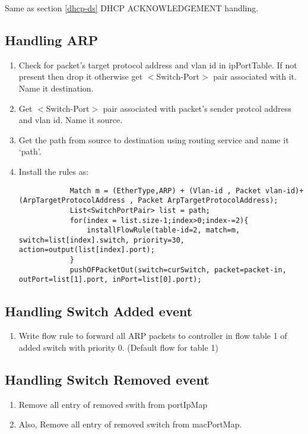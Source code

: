 \documentclass{article}
\begin{document}
Same as section \ref{dhcp-ds} DHCP ACKNOWLEDGEMENT handling.

\subsection{Handling ARP}

\begin{enumerate}
	\item Check for packet's target protocol address and vlan id in ipPortTable. If not present then drop it otherwise get $<$Switch-Port$>$ pair associated with it. Name it destination.
	\item Get $<$Switch-Port$>$ pair associated with packet's sender protcol address and vlan id. Name it source.
	\item Get the path from source to destination using routing service and name it `path'.
	\item Install the rules as:
		\begin{lstlisting}
			Match m = (EtherType,ARP) + (Vlan-id , Packet vlan-id)+(ArpTargetProtocolAddress , Packet ArpTargetProtocolAddress);
			List<SwitchPortPair> list = path;
			for(index = list.size-1;index>0;index-=2){
				installFlowRule(table-id=2, match=m, switch=list[index].switch, priority=30, action=output(list[index].port);
			}
			pushOFPacketOut(switch=curSwitch, packet=packet-in, outPort=list[1].port, inPort=list[0].port);
		\end{lstlisting}
\end{enumerate}

\subsection{Handling Switch Added event}

\begin{enumerate}
	\item Write flow rule to forward all ARP packets to controller in flow table 1 of added switch with priority 0. (Default flow for table 1) 
\end{enumerate}



\subsection{Handling Switch Removed event}

\begin{enumerate}
	\item Remove all entry of removed swith from portIpMap
	\item Also, Remove all entry of removed switch from macPortMap.
\end{enumerate}
\end{document}
